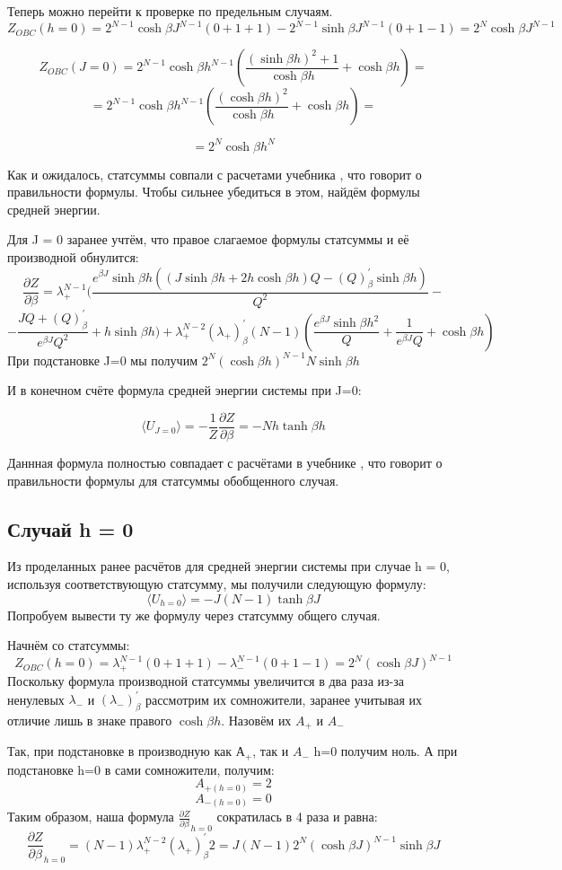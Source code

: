 \documentclass{article}
\newcommand{\bj}{\beta J}
\newcommand{\bh}{\beta h}
\newcommand{\lp}{\lambda_{+}}
\newcommand{\lm}{\lambda_{-}}
\newcommand{\obc}{_{OBC}}
\newcommand{\dzdb}{\frac{\partial Z}{\partial \beta}}
\numberwithin{equation}{section}
\begin{document}
Теперь можно перейти к проверке по предельным случаям.
\[ Z\obc(h = 0) = 2^{N-1}\cosh{\bj}^{N-1} (0 + 1 + 1) - 2^{N-1}\sinh{\bj}^{N-1} (0 + 1 - 1) = 2^{N}\cosh{\bj}^{N-1}\]

\[ Z\obc(J = 0) = 2^{N-1}\cosh{\bh}^{N-1} (\frac{(\sinh{\bh})^{2} + 1}{\cosh{\bh}} +\cosh{\bh}) = \]
\[=2^{N-1}\cosh{\bh}^{N-1} (\frac{(\cosh{\bh})^{2}}{\cosh{\bh}} +\cosh{\bh}) = \]

\[= 2^{N}\cosh{\bh}^{N}\]

Как и ожидалось, статсуммы совпали с расчетами учебника \cite{Swen}, что говорит о правильности формулы. Чтобы сильнее убедиться в этом, найдём формулы средней энергии. 

Для J = 0 заранее учтём, что правое слагаемое формулы статсуммы и её производной обнулится:
\[\dzdb = \lp^{N-1}(\frac{e^{\bj}\sinh{\bh}((J\sinh{\bh} + 2h\cosh{\bh})Q - (Q)^{'}_{\beta}\sinh{\bh})}{Q^{2}} - \]
\[ - \frac{J Q + (Q)^{'}_{\beta}}{e^{\bj} Q^{2}} + h\sinh{\bh}) + \lp^{N-2} (\lp)^{'}_{\beta}(N-1)(\frac{e^{\bj} \sinh{\bh}^2}{Q} + \frac{1}{e^{\bj}Q} + \cosh{\bh})\]
При подстановке J=0 мы получим $2^{N}(\cosh{\bh})^{N-1}N\sinh{\bh}$

И в конечном счёте формула средней энергии системы при J=0: 

\[\langle U_{J = 0} \rangle = - \frac{1}{Z} \dzdb = - N h\tanh{\bh}\]

Даннная формула полностью совпадает с расчётами в учебнике \cite{Swen}, что говорит о правильности формулы для статсуммы обобщенного случая.

\subsection{Случай h = 0}

Из проделанных ранее расчётов для средней энергии системы при случае h = 0, используя соответствующую статсумму, мы получили следующую формулу:
\[ \langle U_{h = 0} \rangle = - J(N - 1)\tanh{\bj} \]
Попробуем вывести ту же формулу через статсумму общего случая.

Начнём со статсуммы:
\[ Z\obc(h=0) = \lp^{N-1}(0 + 1 + 1) - \lm^{N-1}(0 + 1 - 1) = 2^{N}(\cosh{\bj})^{N-1}\]
Поскольку формула производной статсуммы увеличится в два раза из-за ненулевых $\lm$ и $(\lm)^{'}_{\beta}$ рассмотрим их сомножители, заранее учитывая их отличие лишь в знаке правого $\cosh{\bh}$. Назовём их $A_{+}$ и $A_{-}$

Так, при подстановке в производную как $А_{+}$, так и $A_{-}$  h=0 получим ноль. А при подстановке h=0 в сами сомножители, получим:
\[A_{+(h=0)} = 2\]
\[A_{-(h=0)} = 0\]
Таким образом, наша формула $\dzdb_{h=0}$ сократилась в 4 раза и равна:
\[ \dzdb_{h=0} = (N-1)\lp^{N-2}(\lp)^{'}_{\beta}2 = J(N-1)2^{N}(\cosh{\bj})^{N-1}\sinh{\bj}\]
\end{document}
